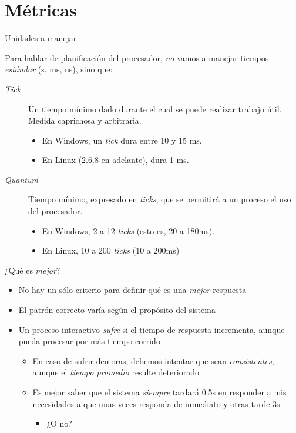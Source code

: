 \documentclass[presentation]{beamer}
\begin{document}
\section{Métricas}
\label{sec:org8114c24}

\begin{frame}[label={sec:org59fb334}]{Unidades a manejar}
\begin{center}
Para hablar de planificación del procesador, \emph{no} vamos a manejar
tiempos \emph{estándar} (s, ms, ns), sino que:
\end{center}
\begin{description}
\item[{\emph{Tick}}] Un tiempo mínimo dado durante el cual se puede realizar
trabajo útil. Medida caprichosa y arbitraria.
\begin{itemize}
\item En Windows, un \emph{tick} dura entre 10 y 15 ms.
\item En Linux (2.6.8 en adelante), dura 1 ms.
\end{itemize}

\item[{\emph{Quantum}}] Tiempo mínimo, expresado en \emph{ticks}, que se permitirá a
un proceso el uso del procesador.

\begin{itemize}
\item En Windows, 2 a 12 \emph{ticks} (esto es, 20 a 180ms).
\item En Linux, 10 a 200 \emph{ticks} (10 a 200ms)
\end{itemize}
\end{description}
\end{frame}

\begin{frame}[label={sec:org95ad44e}]{¿Qué es \emph{mejor}?}
\begin{itemize}
\item No hay un sólo criterio para definir qué es una \emph{mejor} respuesta
\item El patrón correcto varía según el propósito del sistema
\item Un proceso interactivo \emph{sufre} si el tiempo de respuesta incrementa,
aunque pueda procesar por más tiempo corrido
\begin{itemize}
\item En caso de sufrir demoras, debemos intentar que sean
\emph{consistentes}, aunque el \emph{tiempo promedio} resulte deteriorado
\item Es mejor saber que el sistema \emph{siempre} tardará 0.5s en responder
a mis necesidades a que unas veces responda de inmediato y otras
tarde 3s.
\pause
\begin{itemize}
\item ¿O no?
\end{itemize}
\end{itemize}
\end{itemize}
\end{frame}
\end{document}
